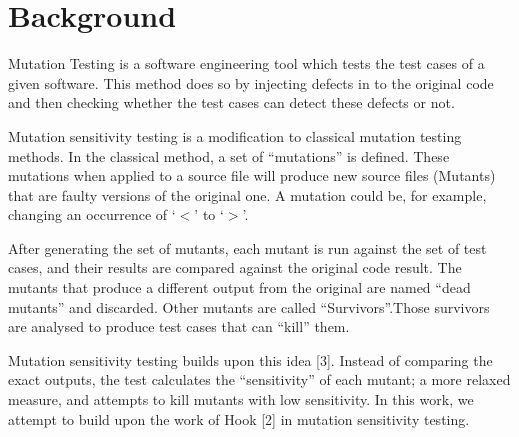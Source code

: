 \documentclass{acm_proc_article-sp}
\begin{document}
\section{Background}


Mutation Testing is a software engineering tool which tests the test cases of a given software. This method does so by injecting defects in to the original code and then checking whether the test cases can detect these defects or not.

Mutation sensitivity testing is a modification to classical mutation testing methods. In the classical method, a set of ``mutations'' is defined. These mutations when applied to a source file will produce new source files (Mutants) that are faulty versions of the original one. A mutation could be, for example, changing an occurrence of `$<$' to `$>$'.

After generating the set of mutants, each mutant is run against the set of test cases, and their results are compared against the original code result. The mutants that produce a different output from the original are named ``dead mutants'' and discarded. Other mutants are called ``Survivors''.Those survivors are analysed to produce test cases that can ``kill'' them.

Mutation sensitivity testing builds upon this idea [3]. Instead of comparing the exact outputs, the test calculates the ``sensitivity'' of each mutant; a more relaxed measure, and attempts to kill mutants with low sensitivity. In this work, we attempt to build upon the work of Hook [2] in mutation sensitivity testing.
\end{document}
